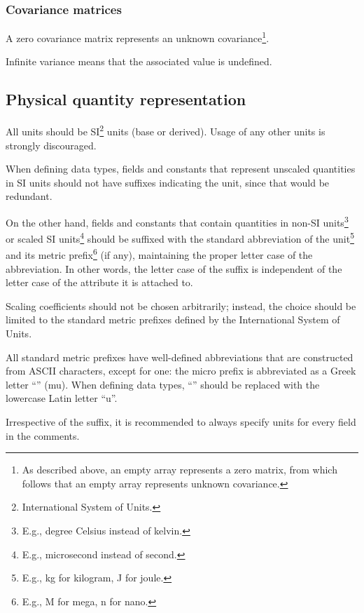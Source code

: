 \subsubsection{Covariance matrices}

A zero covariance matrix represents an unknown covariance\footnote{%
    As described above, an empty array represents a zero matrix,
    from which follows that an empty array represents unknown covariance.
}.

Infinite variance means that the associated value is undefined.

\subsection{Physical quantity representation}

All units should be SI\footnote{International System of Units.} units (base or derived).
Usage of any other units is strongly discouraged.

When defining data types, fields and constants that represent unscaled quantities in SI units
should not have suffixes indicating the unit, since that would be redundant.

On the other hand, fields and constants that contain quantities in
non-SI units\footnote{E.g., degree Celsius instead of kelvin.}
or scaled SI units\footnote{E.g., microsecond instead of second.}
should be suffixed with the standard abbreviation of the unit\footnote{E.g., kg for kilogram, J for joule.}
and its metric prefix\footnote{E.g., M for mega, n for nano.}
(if any), maintaining the proper letter case of the abbreviation.
In other words, the letter case of the suffix is independent of the letter case of
the attribute it is attached to.

Scaling coefficients should not be chosen arbitrarily;
instead, the choice should be limited to the standard metric prefixes defined by the
International System of Units.

All standard metric prefixes have well-defined abbreviations that are constructed from ASCII characters,
except for one: the micro prefix is abbreviated as a Greek letter ``\textmu{}'' (mu).
When defining data types, ``\textmu{}'' should be replaced with the lowercase Latin letter ``u''.

Irrespective of the suffix, it is recommended to always specify units for every field in the comments.

